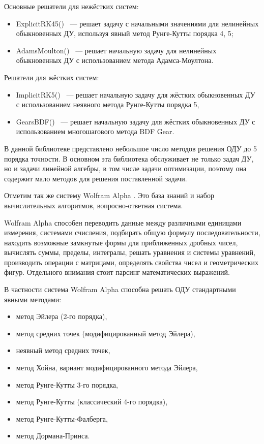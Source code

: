 Основные решатели для нежёстких систем:

\begin{itemize}
    \item ExplicitRK45() ~--- решает задачу с начальными значениями для нелинейных обыкновенных ДУ, используя
        явный метод Рунге-Кутты порядка 4, 5;
    \item AdamsMoulton() ~--- решает начальную задачу для нелинейных обыкновенных ДУ с использованием метода
        Адамса-Моултона.
\end{itemize}

Решатели для жёстких систем:

\begin{itemize}
    \item ImplicitRK5() ~--- решает начальную задачу для жёстких обыкновенных ДУ с использованием неявного
        метода Рунге-Кутты порядка 5,
    \item GearsBDF() ~--- решает начальную задачу для жёстких обыкновенных ДУ с использованием многошагового
        метода BDF Gear.
\end{itemize}

В данной библиотеке представлено небольшое число методов решения ОДУ до 5 порядка точности. В основном эта библиотека обслуживает
не только задач ДУ, но и задачи линейной алгебры, в том числе задачи оптимизации, поэтому она содержит мало методов
для решения поставленной задачи.

Отметим так же систему Wolfram Alpha \cite{Wikipedia10}. Это база знаний и набор вычислительных алгоритмов, вопросно-ответная
система.

Wolfram Alpha способен переводить данные между различными единицами
измерения, системами счисления, подбирать общую формулу последовательности, находить возможные замкнутые формы для приближенных
дробных чисел, вычислять суммы, пределы, интегралы, решать уравнения и системы уравнений, производить операции с матрицами, определять
свойства чисел и геометрических фигур. Отдельного внимания стоит парсинг математических выражений.

В частности система Wolfram Alpha способна решать ОДУ стандартными явными методами:

\begin{itemize}
    \item метод Эйлера (2-го порядка),
    \item метод средних точек (модифицированный метод Эйлера),
    \item неявный метод средних точек,
    \item метод Хойна, вариант модифицированного метода Эйлера,
    \item метод Рунге-Кутты 3-го порядка,
    \item метод Рунге-Кутты (классический 4-го порядка),
    \item метод Рунге-Кутты-Фалберга,
    \item метод Дормана-Принса.
\end{itemize}

